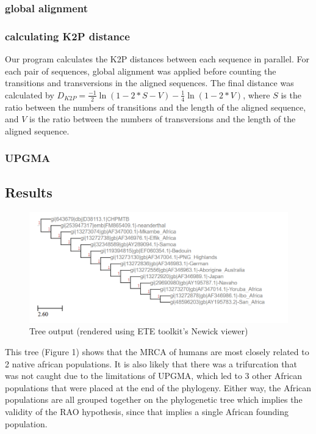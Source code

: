 \documentclass[a4paper]{article}
\begin{document}
\subsubsection{global alignment}



\subsubsection{calculating K2P distance}
Our program calculates the K2P distances between each sequence in parallel. For each pair of sequences, global alignment was applied before counting the transitions and transversions in the aligned sequences. The final distance was calculated by $D_{K2P}=\frac{-1}{2} \ln(1 - 2 * S - V) - \frac{1}{4} \ln(1 - 2 * V)$, where $S$ is the ratio between the numbers of transitions and the length of the aligned sequence, and $V$ is the ratio between the numbers of transversions and the length of the aligned sequence.
\subsubsection{UPGMA}




\subsection{Results}
\begin{figure}
    \centering
    \includegraphics[scale=0.8]{bioinformatics.PNG}
    \caption{Tree output (rendered using ETE toolkit's Newick viewer)}
    \label{fig:my_label}
\end{figure}
This tree (Figure 1) shows that the MRCA of humans are most closely related to 2 native african populations. It is also likely that there was a trifurcation that was not caught due to the limitations of UPGMA, which led to 3 other African populations that were placed at the end of the phylogeny. Either way, the African populations are all grouped together on the phylogenetic tree which implies the validity of the RAO hypothesis, since that implies a single African founding population.




\end{document}
